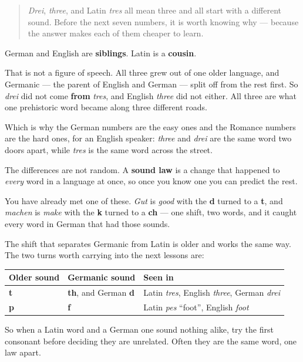 \label{lesson:GE-C06-grimm}



\begin{quote}
\emph{Drei}, \emph{three}, and Latin \emph{tres} all mean three and all start with a different sound. Before the next seven numbers, it is worth knowing why — because the answer makes each of them cheaper to learn.
\end{quote}

\begin{grammarlens}[title={Grammar Lens: siblings and cousins}]
German and English are \textbf{siblings}. Latin is a \textbf{cousin}.

That is not a figure of speech. All three grew out of one older language, and Germanic — the parent of English and German — split off from the rest first. So \emph{drei} did not come \textbf{from} \emph{tres}, and English \emph{three} did not either. All three are what one prehistoric word became along three different roads.

Which is why the German numbers are the easy ones and the Romance numbers are the hard ones, for an English speaker: \emph{three} and \emph{drei} are the same word two doors apart, while \emph{tres} is the same word across the street.
\end{grammarlens}

\begin{culture}
The differences are not random. A \textbf{sound law} is a change that happened to \emph{every} word in a language at once, so once you know one you can predict the rest.

You have already met one of these. \emph{Gut} is \emph{good} with the \textbf{d} turned to a \textbf{t}, and \emph{machen} is \emph{make} with the \textbf{k} turned to a \textbf{ch} — one shift, two words, and it caught every word in German that had those sounds.

The shift that separates Germanic from Latin is older and works the same way. The two turns worth carrying into the next lessons are:

\noindent
\begin{tabularx}{\linewidth}{@{}>{\raggedright\arraybackslash}X>{\raggedright\arraybackslash}X>{\raggedright\arraybackslash}X@{}}
\toprule
\textbf{Older sound} & \textbf{Germanic sound} & \textbf{Seen in} \\
\midrule
\textbf{t} & \textbf{th}, and German \textbf{d} & Latin \emph{tres}, English \emph{three}, German \emph{drei} \\
\textbf{p} & \textbf{f} & Latin \emph{pes} \textquotedblleft{}foot\textquotedblright{}, English \emph{foot} \\
\bottomrule
\end{tabularx}

So when a Latin word and a German one sound nothing alike, try the first consonant before deciding they are unrelated. Often they are the same word, one law apart.
\end{culture}

